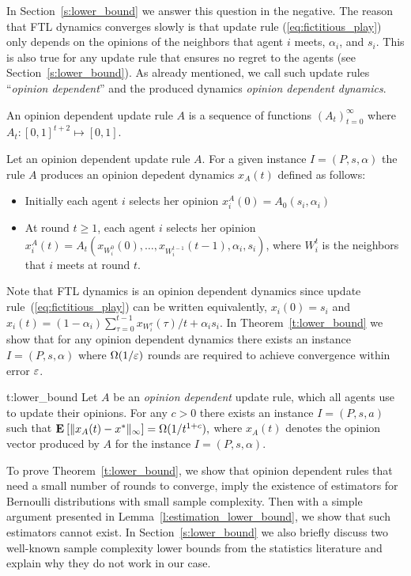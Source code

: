 In Section~\ref{s:lower_bound} we answer this question in the negative.
The reason that FTL dynamics converges slowly is that
update rule (\ref{eq:fictitious_play})
only depends on the opinions of the neighbors that agent $i$ meets,
$\alpha_i$, and $s_i$. This is also true for any update rule that
ensures no regret to the agents (see Section~\ref{s:lower_bound}).
As already mentioned, we call such update rules \enquote{\emph{opinion dependent}}
and the produced dynamics \emph{opinion dependent dynamics}.

\begin{definition}\label{d:opinion_dependent_dynamics}
An opinion dependent update rule $A$ is a sequence of
functions $(A_t)_{t=0}^\infty$ where
$A_t: [0,1]^{t+2}\mapsto [0,1]$.
\end{definition}

\begin{definition}\label{d:opinion_dependent_dynamics}
Let an opinion dependent update rule $A$. For a given instance $I=(P,s,\alpha)$
the rule $A$ produces an opinion depedent dynamics $x_A(t)$ defined as follows:
\begin{itemize}
 \item Initially each agent $i$ selects her opinion $x_i^A(0)=A_0(s_i,\alpha_i)$
 \item At round $t\geq 1$, each agent $i$ selects her opinion
   \(x_i^A(t)=A_t(x_{W_i^0}(0),\dots,x_{W_i^{t-1}}(t-1),\alpha_i,s_i)\),
where $W_i^t$ is the neighbors that $i$ meets at round $t$.
\end{itemize}
\end{definition}

Note that FTL dynamics is an opinion dependent dynamics
since update rule~(\ref{eq:fictitious_play}) can
be written equivalently, $x_i(0)=s_i$ and $x_i(t)=(1-\alpha_i)\sum_{\tau=0}^{t-1}x_{W_i^\tau}(\tau)/t + \alpha_i s_i$.
In Theorem~\ref{t:lower_bound} we
show that for any opinion dependent dynamics there exists an instance
$I = (P,s,\alpha)$ where $\Omega(1/\varepsilon)$ rounds are required to
achieve convergence within error $\varepsilon$.
\begin{reptheorem}{t:lower_bound}
  Let $A$ be an \emph{opinion dependent} update rule, which all
  agents use to update their opinions.
  For any $c>0$ there exists an instance $I=(P,s,a)$ such that
  \(
    \Exp{\norm{\infty}{x_A(t) - x^*}} = \Omega(1/t^{1+c}),
  \)
  where $x_A(t)$ denotes the opinion vector produced by $A$
  for the instance $I=(P,s,\alpha)$.
\end{reptheorem}
%
To prove Theorem~\ref{t:lower_bound}, we show that opinion dependent rules
that need a small number of rounds to converge, imply the existence
of estimators for Bernoulli distributions with
small sample complexity. Then with a simple argument
presented in Lemma~\ref{l:estimation_lower_bound},
we show that such estimators cannot exist.
In Section~\ref{s:lower_bound} we also
briefly discuss two well-known sample complexity lower bounds
from the statistics literature and explain why they do not work in our case.

